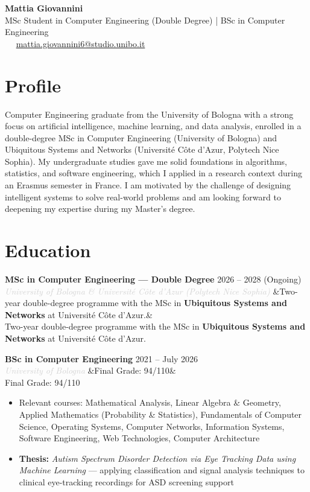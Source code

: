 \documentclass[a4paper,10pt]{article}
\newcommand{\entry}[4]{%
  \noindent\textbf{#1} \hfill \textcolor{accent}{#2}\\
  \textit{\textcolor{lightgray}{#3}}%
  \ifx&#4&\else\\\vspace{0.2em}#4\fi
  \vspace{0.5em}
}
\newcommand{\entrylist}[5]{%
  \noindent\textbf{#1} \hfill \textcolor{accent}{#2}\\
  \textit{\textcolor{lightgray}{#3}}%
  \ifx&#4&\else\\\vspace{0.2em}#4\fi
  \vspace{0.3em}
  \begin{itemize}#5\end{itemize}
  \vspace{0.3em}
}
\begin{document}
\begin{center}
  {\Huge\bfseries\color{darkgray} Mattia Giovannini}\\[0.4em]
  {\large\color{accent} MSc Student in Computer Engineering (Double Degree) | BSc in Computer Engineering}\\[0.7em]
  \textcolor{lightgray}{
    \faPhone\ \PrivatePhone
    \quad\textbullet\quad
    \faEnvelope\ \href{mailto:mattia.giovannini6@studio.unibo.it}{mattia.giovannini6@studio.unibo.it}
  }
\end{center}

\vspace{0.5em}

\section{Profile}

Computer Engineering graduate from the University of Bologna with a strong focus on artificial
intelligence, machine learning, and data analysis, enrolled in a double-degree MSc in Computer Engineering
(University of Bologna) and Ubiquitous Systems and Networks (Université Côte d'Azur, Polytech Nice Sophia). My undergraduate studies gave me solid foundations in algorithms, statistics,
and software engineering, which I applied in a research context during an Erasmus semester in France.
I am motivated by the challenge of designing intelligent systems to solve real-world problems and
am looking forward to deepening my expertise during my Master's degree.

\section{Education}

\entry{MSc in Computer Engineering — Double Degree}{2026 -- 2028 (Ongoing)}{University of Bologna \& Université Côte d'Azur (Polytech Nice Sophia)}
{Two-year double-degree programme with the MSc in \textbf{Ubiquitous Systems and Networks} at Université Côte d'Azur.}

\entrylist{BSc in Computer Engineering}{2021 -- July 2026}{University of Bologna}{Final Grade: 94/110}{
  \item Relevant courses: Mathematical Analysis, Linear Algebra \& Geometry,
        Applied Mathematics (Probability \& Statistics), Fundamentals of Computer Science,
        Operating Systems, Computer Networks, Information Systems,
        Software Engineering, Web Technologies, Computer Architecture
  \item \textbf{Thesis:} \textit{Autism Spectrum Disorder Detection via Eye Tracking Data
        using Machine Learning} — applying classification and signal analysis techniques
        to clinical eye-tracking recordings for ASD screening support
}
\end{document}

